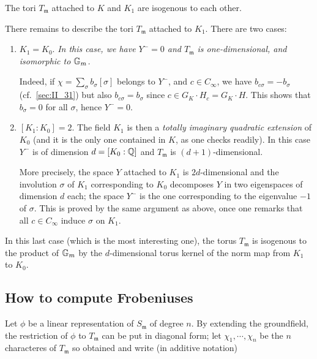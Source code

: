 \begin{corp}
	The tori $T_{\mathfrak{m}}$ attached to $K$ and $K_1$ are isogenous to
	each other.
\end{corp}
There remains to describe the tori $T_{\mathfrak{m}}$ attached to $K_1$.
There are two cases:
\begin{enumerate}[(1), wide]
\item $K_1 = K_0$.
	\emph{In this case, we have $Y^- = 0$ and $T_{\mathfrak{m}}$ is
	one-dimensional, and isomorphic to $\mathbb{G}_m$.}

	Indeed, if $\chi = \sum_{\sigma} b_\sigma[\sigma]$ belongs to $Y^-$,
	and $c \in C_\infty$, we have $b_{c \sigma} = -b_\sigma$ (cf.\
	\ref{sec:II_31}) but also $b_{c \sigma} = b_\sigma$ since $c \in G_K
	\cdot H_c = G_K \cdot H$. This shows that $b_\sigma = 0$ for all
	$\sigma$, hence $Y^- = 0$.

\item $[K_1 : K_0] = 2$.
	The field $K_1$ is then a \emph{totally imaginary quadratic extension}
	of $K_0$ (and it is the only one contained in $K$, as one checks
	readily). In this case $Y^-$ is of dimension $d = [K_0 : \mathbb{Q}]$ and
	$T_{\mathfrak{m}}$ is $(d+1)$-dimensional.

	More precisely, the space $Y$ attached to $K_1$ is $2d$-dimensional
	\dpage
	and the involution $\sigma$ of $K_1$ corresponding to $K_0$ decomposes
	$Y$ in two eigenspaces of dimension $d$ each; the space $Y^-$ is the
	one corresponding to the eigenvalue $-1$ of $\sigma$. This is proved by
	the same argument as above, once one remarks that all $c \in C_\infty$
	induce $\sigma$ on $K_1$.
\end{enumerate}

\begin{obs}
In this last case (which is the most interesting one), the torus
$T_{\mathfrak{m}}$ is isogenous to the product of $\mathbb{G}_m$ by the
$d$-dimensional torus kernel of the norm map from $K_1$ to $K_0$.
\end{obs}

\subsection{How to compute Frobeniuses} %
\label{sec:II_34}
Let $\phi$ be a linear representation of $S_\mathfrak{m}$ of degree
$n$. By extending the groundfield, the restriction of $ \phi $ to
$ T_\mathfrak{m} $ can be put in diagonal form; let $ \chi_1,\cdots, \chi_n $ 
be the $ n $ characteres of $T_\mathfrak{m}$ so obtained and write (in additive 
notation)

